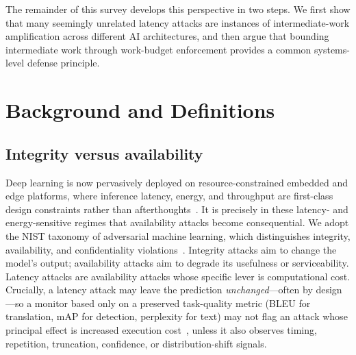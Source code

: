 \documentclass[acmsmall,screen,review,nonacm]{acmart}
\begin{document}
The remainder of this survey develops this perspective in two steps. We first show that many seemingly unrelated latency attacks are instances of intermediate-work amplification across different AI architectures, and then argue that bounding intermediate work through work-budget enforcement provides a common systems-level defense principle.

\section{Background and Definitions}
\label{sec:background}

\subsection{Integrity versus availability}

Deep learning is now pervasively deployed on resource-constrained embedded and edge platforms, where inference latency, energy, and throughput are first-class design constraints rather than afterthoughts~\cite{luo2024efficient,marco2020adaptive,kim2025emamba}. It is precisely in these latency- and energy-sensitive regimes that availability attacks become consequential. We adopt the NIST taxonomy of adversarial machine learning, which distinguishes integrity, availability, and confidentiality violations~\cite{vassilev2023nist}. Integrity attacks aim to change the model's output; availability attacks aim to degrade its usefulness or serviceability. Latency attacks are availability attacks whose specific lever is computational cost. Crucially, a latency attack may leave the prediction \emph{unchanged}---often by design---so a monitor based only on a preserved task-quality metric (BLEU for translation, mAP for detection, perplexity for text) may not flag an attack whose principal effect is increased execution cost~\cite{chen2022nmtsloth,shapira2023phantom}, unless it also observes timing, repetition, truncation, confidence, or distribution-shift signals. %
\end{document}
